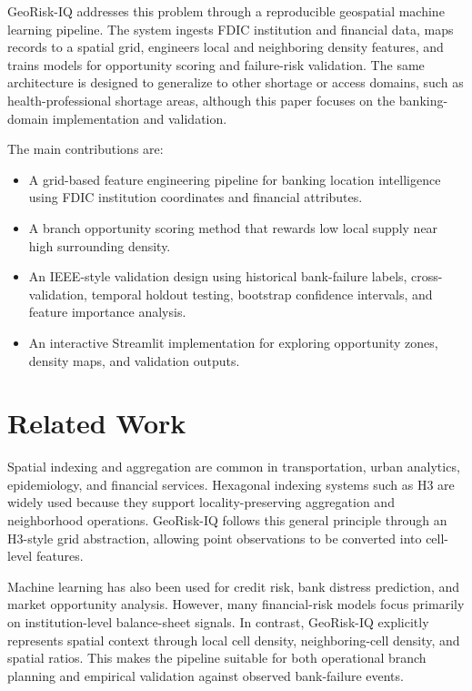 \documentclass[conference]{IEEEtran}
\begin{document}
GeoRisk-IQ addresses this problem through a reproducible geospatial machine
learning pipeline. The system ingests FDIC institution and financial data,
maps records to a spatial grid, engineers local and neighboring density
features, and trains models for opportunity scoring and failure-risk
validation. The same architecture is designed to generalize to other shortage
or access domains, such as health-professional shortage areas, although this
paper focuses on the banking-domain implementation and validation.

The main contributions are:
\begin{itemize}
    \item A grid-based feature engineering pipeline for banking location
    intelligence using FDIC institution coordinates and financial attributes.
    \item A branch opportunity scoring method that rewards low local supply
    near high surrounding density.
    \item An IEEE-style validation design using historical bank-failure
    labels, cross-validation, temporal holdout testing, bootstrap confidence
    intervals, and feature importance analysis.
    \item An interactive Streamlit implementation for exploring opportunity
    zones, density maps, and validation outputs.
\end{itemize}

\section{Related Work}
Spatial indexing and aggregation are common in transportation, urban
analytics, epidemiology, and financial services. Hexagonal indexing systems
such as H3 are widely used because they support locality-preserving
aggregation and neighborhood operations. GeoRisk-IQ follows this general
principle through an H3-style grid abstraction, allowing point observations
to be converted into cell-level features.

Machine learning has also been used for credit risk, bank distress
prediction, and market opportunity analysis. However, many financial-risk
models focus primarily on institution-level balance-sheet signals. In
contrast, GeoRisk-IQ explicitly represents spatial context through local
cell density, neighboring-cell density, and spatial ratios. This makes the
pipeline suitable for both operational branch planning and empirical
validation against observed bank-failure events.
\end{document}
